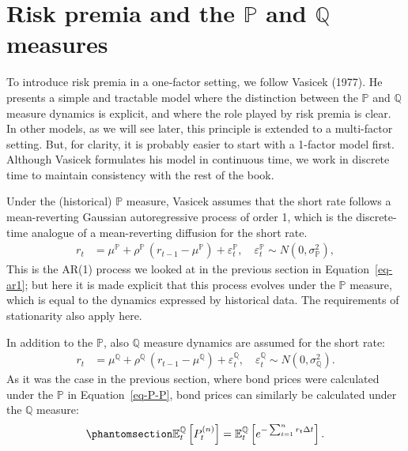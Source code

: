 \documentclass[
  letterpaper,
  DIV=11,
  numbers=noendperiod]{scrreprt}
\begin{document}
\section{\texorpdfstring{Risk premia and the \(\mathbb{P}\) and
\(\mathbb{Q}\)
measures}{Risk premia and the \textbackslash mathbb\{P\} and \textbackslash mathbb\{Q\} measures}}\label{risk-premia-and-the-mathbbp-and-mathbbq-measures}

To introduce risk premia in a one‑factor setting, we follow Vasicek
(1977). He presents a simple and tractable model where the distinction
between the \(\mathbb{P}\) and \(\mathbb{Q}\) measure dynamics is
explicit, and where the role played by risk premia is clear. In other
models, as we will see later, this principle is extended to a
multi-factor setting. But, for clarity, it is probably easier to start
with a 1-factor model first. Although Vasicek formulates his model in
continuous time, we work in discrete time to maintain consistency with
the rest of the book.

Under the (historical) \(\mathbb{P}\) measure, Vasicek assumes that the
short rate follows a mean-reverting Gaussian autoregressive process of
order 1, which is the discrete-time analogue of a mean-reverting
diffusion for the short rate.
\begin{align}
    r_t &= \mu^{\mathbb{P}} + \rho^{\mathbb{P}} \, (r_{t-1} - \mu^{\mathbb{P}}) + \varepsilon^{\mathbb{P}}_t, \quad \varepsilon^{\mathbb{P}}_t \sim N(0, \sigma_{\mathbb{P}}^2),
\end{align}
This is the AR(1) process we looked at in the previous section in
Equation~\ref{eq-ar1}; but here it is made explicit that this process
evolves under the \(\mathbb{P}\) measure, which is equal to the dynamics
expressed by historical data. The requirements of stationarity also
apply here.

In addition to the \(\mathbb{P}\), also \(\mathbb{Q}\) measure dynamics
are assumed for the short rate:
\begin{align}
    r_t &= \mu^{\mathbb{Q}} + \rho^{\mathbb{Q}} \, (r_{t-1} - \mu^{\mathbb{Q}}) + \varepsilon^{\mathbb{Q}}_t, \quad \varepsilon^{\mathbb{Q}}_t \sim N(0, \sigma_{\mathbb{Q}}^2).
\end{align}
As it was the case in the previous section, where bond prices were
calculated under the \(\mathbb{P}\) in Equation~\ref{eq-P-P}, bond
prices can similarly be calculated under the \(\mathbb{Q}\) measure:
\begin{equation}\protect\phantomsection\label{eq-P-Q}{
\begin{align}
         \mathbb{E}_t^{\mathbb{Q}} \left[P_t^{(n)}\right] = \mathbb{E}^{\mathbb{Q}}_t\left[ e^{-\sum^{n}_{t=1} r_t\Delta t} \right].
\end{align}
}\end{equation}
\end{document}
